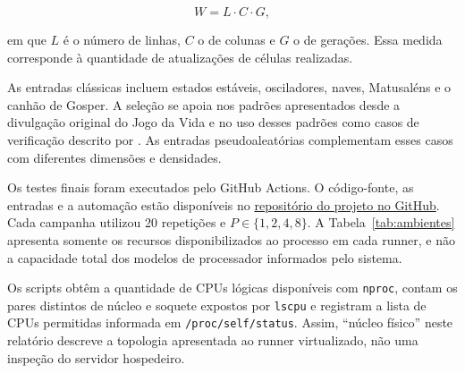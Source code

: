 \documentclass[12pt,a4paper]{article}
\begin{document}
\begin{equation}
    W = L \cdot C \cdot G,
\end{equation}

em que $L$ é o número de linhas, $C$ o de colunas e $G$ o de gerações. Essa
medida corresponde à quantidade de atualizações de células realizadas.

As entradas clássicas incluem estados estáveis, osciladores, naves, Matusaléns
e o canhão de Gosper. A seleção se apoia nos padrões apresentados desde a
divulgação original do Jogo da Vida \parencite{gardner1970life} e no uso desses
padrões como casos de verificação descrito por \textcite{chin2012flame}. As
entradas pseudoaleatórias complementam esses casos com diferentes dimensões e
densidades.

Os testes finais foram executados pelo GitHub Actions. O código-fonte, as
entradas e a automação estão disponíveis no
\href{https://github.com/SamuelScar/game-of-life-pthreads}{repositório do projeto
no GitHub}. Cada campanha utilizou 20 repetições e
$P\in\{1,2,4,8\}$. A Tabela~\ref{tab:ambientes} apresenta somente os recursos
disponibilizados ao processo em cada runner, e não a capacidade total dos
modelos de processador informados pelo sistema.

Os scripts obtêm a quantidade de CPUs lógicas disponíveis com \texttt{nproc},
contam os pares distintos de núcleo e soquete expostos por \texttt{lscpu} e
registram a lista de CPUs permitidas informada em \texttt{/proc/self/status}.
Assim, ``núcleo físico'' neste relatório descreve a topologia apresentada ao
runner virtualizado, não uma inspeção do servidor hospedeiro.

\begin{table}[htbp]
\centering
\small
{}
\caption{Recursos disponibilizados pelos runners do GitHub Actions.}
\label{tab:ambientes}
\end{table}
\end{document}
